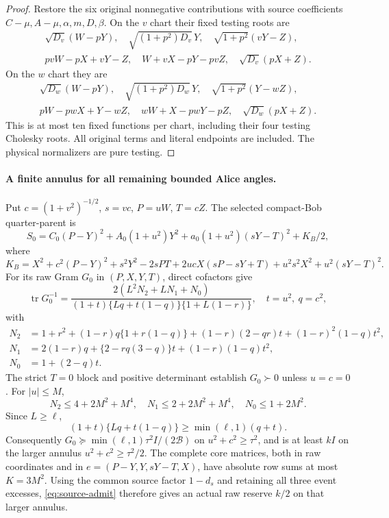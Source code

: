 \documentclass[11pt]{article}
\begin{document}
\begin{proof}
Restore the six original nonnegative contributions with source
coefficients $C-\mu,A-\mu,\alpha,m,D,\beta$.
On the $v$ chart their fixed testing roots are
\begin{gather*}
 \sqrt{D_v}(W-pY),\quad\sqrt{(1+p^2)D_v}\,Y,
 \quad\sqrt{1+p^2}(vY-Z),\\
 pvW-pX+vY-Z,\quad W+vX-pY-pvZ,
 \quad\sqrt{D_v}(pX+Z).
\end{gather*}
On the $w$ chart they are
\begin{gather*}
 \sqrt{D_w}(W-pY),\quad\sqrt{(1+p^2)D_w}\,Y,
 \quad\sqrt{1+p^2}(Y-wZ),\\
 pW-pwX+Y-wZ,\quad wW+X-pwY-pZ,
 \quad\sqrt{D_w}(pX+Z).
\end{gather*}
This is at most ten fixed functions per chart, including their four
testing Cholesky roots. All original terms and literal endpoints
are included. The physical normalizers are pure testing.
\end{proof}

\paragraph{A finite annulus for all remaining bounded Alice angles.}
Put $c=(1+v^2)^{-1/2}$, $s=vc$, $P=uW$, $T=cZ$.
The selected compact-Bob quarter-parent is
\[
 S_0=C_0(P-Y)^2+A_0(1+u^2)Y^2
                       +a_0(1+u^2)(sY-T)^2+K_B/2,
\]
where
\[
 K_B=X^2+c^2(P-Y)^2+s^2Y^2-2sPT
 +2ucX(sP-sY+T)+u^2s^2X^2+u^2(sY-T)^2.
\]
For its raw Gram $G_0$ in $(P,X,Y,T)$, direct cofactors give
\[
 \operatorname{tr}G_0^{-1}
 =\frac{2(L^2N_2+LN_1+N_0)}
 {(1+t)\{Lq+t(1-q)\}\{1+L(1-r)\}},\quad t=u^2,\ q=c^2,
\]
with
\begin{align*}
 N_2&=1+r^2+(1-r)q\{1+r(1-q)\}
 +(1-r)(2-qr)t+(1-r)^2(1-q)t^2,\\
 N_1&=2(1-r)q+\{2-rq(3-q)\}t+(1-r)(1-q)t^2,\\
 N_0&=1+(2-q)t.
\end{align*}
The strict $T=0$ block and positive determinant establish
$G_0\succ0$ unless $u=c=0$. For $|u|\le M$,
\[
 N_2\le4+2M^2+M^4,\quad N_1\le2+2M^2+M^4,
 \quad N_0\le1+2M^2.
\]
Since $L\ge\ell$,
\[
 (1+t)\{Lq+t(1-q)\}\ge\min(\ell,1)(q+t).
\]
Consequently $G_0\succeq\min(\ell,1)\tau^2I/(2\mathcal B)$ on
$u^2+c^2\ge\tau^2$, and is at least $kI$ on the larger annulus
$u^2+c^2\ge\tau^2/2$. The complete core matrices, both in raw
coordinates and in
$e=(P-Y,Y,sY-T,X)$, have absolute row sums at most $K=3M^2$.
Using the common source factor $1-d_s$ and retaining all three event
excesses, \eqref{eq:source-admit} therefore gives an actual raw
reserve $k/2$ on that larger annulus.
\end{document}
